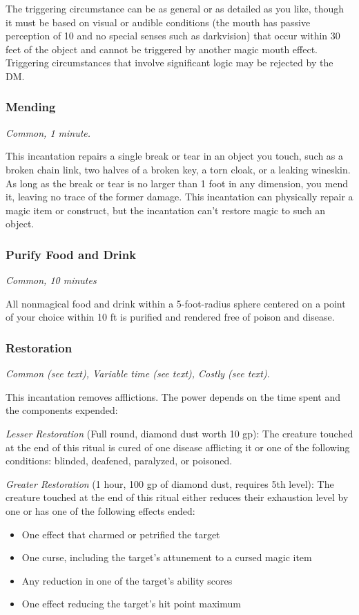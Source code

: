 The triggering circumstance can be as general or as detailed as you like, though it must be based on visual or audible conditions (the mouth has passive perception of 10 and no special senses such as darkvision) that occur within 30 feet of the object and cannot be triggered by another magic mouth effect. Triggering circumstances that involve significant logic may be rejected by the DM.

\subsubsection{Mending}
\textit{Common, 1 minute.}

This incantation repairs a single break or tear in an object you touch, such as a broken chain link, two halves of a broken key, a torn cloak, or a leaking wineskin. As long as the break or tear is no larger than 1 foot in any dimension, you mend it, leaving no trace of the former damage. This incantation can physically repair a magic item or construct, but the incantation can't restore magic to such an object.

\subsubsection{Purify Food and Drink}
\textit{Common, 10 minutes}

All nonmagical food and drink within a 5-foot-radius sphere centered on a point of your choice within 10 ft is purified and rendered free of poison and disease.

\subsubsection{Restoration}\label{inc:restoration}
\textit{Common (see text), Variable time (see text), Costly (see text).}

This incantation removes afflictions. The power depends on the time spent and the components expended:

\textit{Lesser Restoration} (Full round, diamond dust worth 10 gp): The creature touched at the end of this ritual is cured of one disease afflicting it or one of the following conditions: blinded, deafened, paralyzed, or poisoned.

\textit{Greater Restoration} (1 hour, 100 gp of diamond dust, requires 5th level): The creature touched at the end of this ritual either reduces their exhaustion level by one or has one of the following effects ended:
\begin{itemize}
\item One effect that charmed or petrified the target
\item One curse, including the target's attunement to a cursed magic item
\item Any reduction in one of the target's ability scores
\item One effect reducing the target's hit point maximum
\end{itemize}

